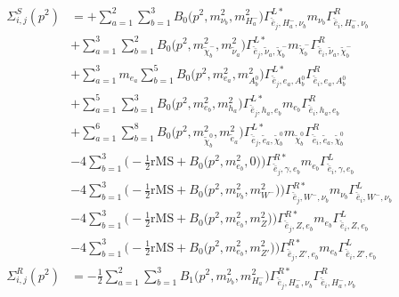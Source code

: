 \begin{itemize}
\begin{align} 
\Sigma^S_{i,j}(p^2) &= +\sum_{a=1}^{2}\sum_{b=1}^{3}{B_0\Big(p^{2},m^2_{\nu_{{b}}},m^2_{H^-_{{a}}}\Big)} {\Gamma^{L*}_{\check{\bar{e}}_{{j}},H^-_{{a}},\nu_{{b}}}} m_{\nu_{{b}}} {\Gamma^R_{\check{\bar{e}}_{{i}},H^-_{{a}},\nu_{{b}}}} \nonumber \\ 
 &+\sum_{a=1}^{3}\sum_{b=1}^{2}{B_0\Big(p^{2},m^2_{\tilde{\chi}^-_{{b}}},m^2_{\tilde{\nu}_{{a}}}\Big)} {\Gamma^{L*}_{\check{\bar{e}}_{{j}},\tilde{\nu}_{{a}},\tilde{\chi}^-_{{b}}}} m_{\tilde{\chi}^-_{{b}}} {\Gamma^R_{\check{\bar{e}}_{{i}},\tilde{\nu}_{{a}},\tilde{\chi}^-_{{b}}}} \nonumber \\ 
 &+\sum_{a=1}^{3}m_{e_{{a}}} \sum_{b=1}^{5}{B_0\Big(p^{2},m^2_{e_{{a}}},m^2_{A^0_{{b}}}\Big)} {\Gamma^{L*}_{\check{\bar{e}}_{{j}},e_{{a}},A^0_{{b}}}} {\Gamma^R_{\check{\bar{e}}_{{i}},e_{{a}},A^0_{{b}}}}  \nonumber \\ 
 &+\sum_{a=1}^{5}\sum_{b=1}^{3}{B_0\Big(p^{2},m^2_{e_{{b}}},m^2_{h_{{a}}}\Big)} {\Gamma^{L*}_{\check{\bar{e}}_{{j}},h_{{a}},e_{{b}}}} m_{e_{{b}}} {\Gamma^R_{\check{\bar{e}}_{{i}},h_{{a}},e_{{b}}}} \nonumber \\ 
 &+\sum_{a=1}^{6}\sum_{b=1}^{8}{B_0\Big(p^{2},m^2_{\tilde{\chi}^0_{{b}}},m^2_{\tilde{e}_{{a}}}\Big)} {\Gamma^{L*}_{\check{\bar{e}}_{{j}},\tilde{e}_{{a}},\tilde{\chi}^0_{{b}}}} m_{\tilde{\chi}^0_{{b}}} {\Gamma^R_{\check{\bar{e}}_{{i}},\tilde{e}_{{a}},\tilde{\chi}^0_{{b}}}} \nonumber \\ 
 &-4 \sum_{b=1}^{3}\Big(-\frac{1}{2} \text{rMS}  + {B_0\Big(p^{2},m^2_{e_{{b}}},0\Big)}\Big){\Gamma^{R*}_{\check{\bar{e}}_{{j}},\gamma,e_{{b}}}} m_{e_{{b}}} {\Gamma^L_{\check{\bar{e}}_{{i}},\gamma,e_{{b}}}}  \nonumber \\ 
 &-4 \sum_{b=1}^{3}\Big(-\frac{1}{2} \text{rMS}  + {B_0\Big(p^{2},m^2_{\nu_{{b}}},m^2_{W^-}\Big)}\Big){\Gamma^{R*}_{\check{\bar{e}}_{{j}},W^-,\nu_{{b}}}} m_{\nu_{{b}}} {\Gamma^L_{\check{\bar{e}}_{{i}},W^-,\nu_{{b}}}}  \nonumber \\ 
 &-4 \sum_{b=1}^{3}\Big(-\frac{1}{2} \text{rMS}  + {B_0\Big(p^{2},m^2_{e_{{b}}},m^2_{Z}\Big)}\Big){\Gamma^{R*}_{\check{\bar{e}}_{{j}},Z,e_{{b}}}} m_{e_{{b}}} {\Gamma^L_{\check{\bar{e}}_{{i}},Z,e_{{b}}}}  \nonumber \\ 
 &-4 \sum_{b=1}^{3}\Big(-\frac{1}{2} \text{rMS}  + {B_0\Big(p^{2},m^2_{e_{{b}}},m^2_{{Z'}}\Big)}\Big){\Gamma^{R*}_{\check{\bar{e}}_{{j}},{Z'},e_{{b}}}} m_{e_{{b}}} {\Gamma^L_{\check{\bar{e}}_{{i}},{Z'},e_{{b}}}}  \\ 
\Sigma^R_{i,j}(p^2) &= -\frac{1}{2} \sum_{a=1}^{2}\sum_{b=1}^{3}{B_1\Big(p^{2},m^2_{\nu_{{b}}},m^2_{H^-_{{a}}}\Big)} {\Gamma^{R*}_{\check{\bar{e}}_{{j}},H^-_{{a}},\nu_{{b}}}} {\Gamma^R_{\check{\bar{e}}_{{i}},H^-_{{a}},\nu_{{b}}}}  \nonumber \\ 

\end{align}
\end{itemize}
